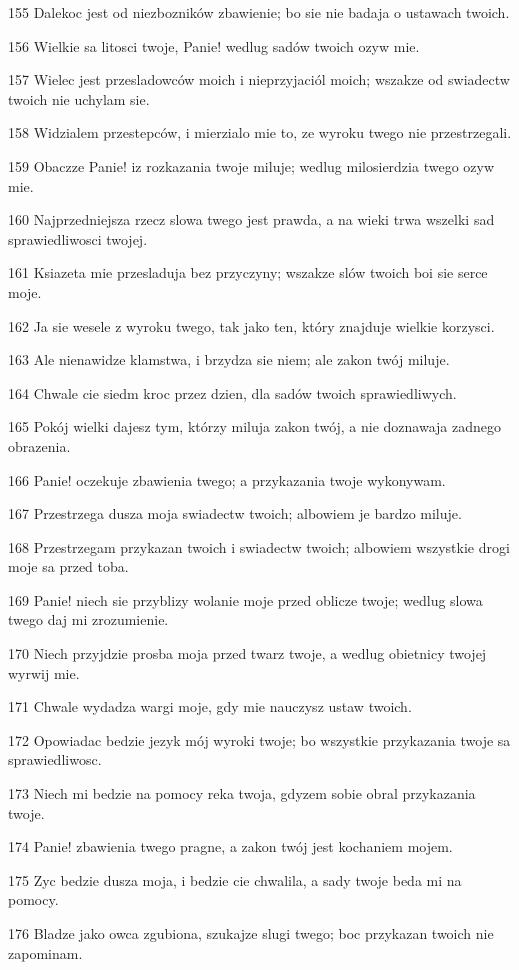 \par 155 Dalekoc jest od niezbozników zbawienie; bo sie nie badaja o ustawach twoich.
\par 156 Wielkie sa litosci twoje, Panie! wedlug sadów twoich ozyw mie.
\par 157 Wielec jest przesladowców moich i nieprzyjaciól moich; wszakze od swiadectw twoich nie uchylam sie.
\par 158 Widzialem przestepców, i mierzialo mie to, ze wyroku twego nie przestrzegali.
\par 159 Obaczze Panie! iz rozkazania twoje miluje; wedlug milosierdzia twego ozyw mie.
\par 160 Najprzedniejsza rzecz slowa twego jest prawda, a na wieki trwa wszelki sad sprawiedliwosci twojej.
\par 161 Ksiazeta mie przesladuja bez przyczyny; wszakze slów twoich boi sie serce moje.
\par 162 Ja sie wesele z wyroku twego, tak jako ten, który znajduje wielkie korzysci.
\par 163 Ale nienawidze klamstwa, i brzydza sie niem; ale zakon twój miluje.
\par 164 Chwale cie siedm kroc przez dzien, dla sadów twoich sprawiedliwych.
\par 165 Pokój wielki dajesz tym, którzy miluja zakon twój, a nie doznawaja zadnego obrazenia.
\par 166 Panie! oczekuje zbawienia twego; a przykazania twoje wykonywam.
\par 167 Przestrzega dusza moja swiadectw twoich; albowiem je bardzo miluje.
\par 168 Przestrzegam przykazan twoich i swiadectw twoich; albowiem wszystkie drogi moje sa przed toba.
\par 169 Panie! niech sie przyblizy wolanie moje przed oblicze twoje; wedlug slowa twego daj mi zrozumienie.
\par 170 Niech przyjdzie prosba moja przed twarz twoje, a wedlug obietnicy twojej wyrwij mie.
\par 171 Chwale wydadza wargi moje, gdy mie nauczysz ustaw twoich.
\par 172 Opowiadac bedzie jezyk mój wyroki twoje; bo wszystkie przykazania twoje sa sprawiedliwosc.
\par 173 Niech mi bedzie na pomocy reka twoja, gdyzem sobie obral przykazania twoje.
\par 174 Panie! zbawienia twego pragne, a zakon twój jest kochaniem mojem.
\par 175 Zyc bedzie dusza moja, i bedzie cie chwalila, a sady twoje beda mi na pomocy.
\par 176 Bladze jako owca zgubiona, szukajze slugi twego; boc przykazan twoich nie zapominam.

